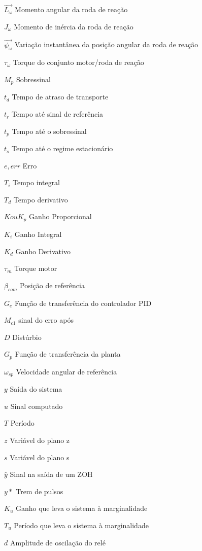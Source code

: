 \begin{simbolos}
  \item[$\vec{L_{\omega}}$] Momento angular da roda de reação
  \item[$J_{\omega}$] Momento de inércia da roda de reação
  \item[$\vec{\psi_{\omega}}$] Variação instantânea da posição angular da roda de reação
  \item[$\tau_{\omega}$] Torque do conjunto motor/roda de reação
  \item[$M_p$] Sobressinal
  \item[$t_d$] Tempo de atraso de transporte
  \item[$t_r$] Tempo até sinal de referência
  \item[$t_p$] Tempo até o sobressinal
  \item[$t_s$] Tempo até o regime estacionário
  \item[$e,err$] Erro
  \item[$T_i$] Tempo integral
  \item[$T_d$] Tempo derivativo
  \item[$K  ou   K_p$] Ganho Proporcional
  \item[$K_i$] Ganho Integral
  \item[$K_d$] Ganho Derivativo
  \item[$\tau_m$] Torque motor
  \item[$\beta_{com}$] Posição de referência
  \item[$G_e$] Função de transferência do controlador PID
  \item[$M_{c1}$] sinal do erro após
  \item[$D$] Distúrbio
  \item[$G_p$] Função de transferência da planta
  \item[$\omega_{sp}$] Velocidade angular de referência
  \item[$y$] Saída do sistema
  \item[$u$] Sinal computado
  \item[$T$] Período
  \item[$z$] Variável do plano z
  \item[$s$] Variável do plano s
  \item[$\hat{y}$] Sinal na saída de um ZOH
  \item[$y*$] Trem de pulsos
  \item[$K_u$] Ganho que leva o sistema à marginalidade
  \item[$T_u$] Período que leva o sistema à marginalidade
  \item[$d$] Amplitude de oscilação do relé

\end{simbolos}
